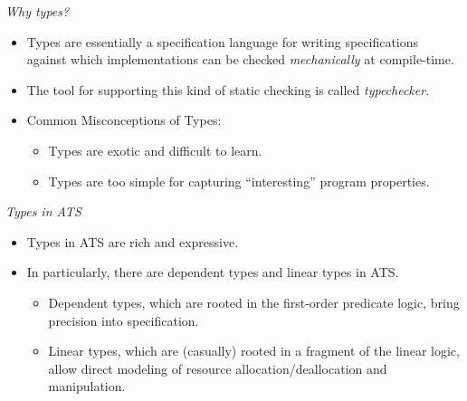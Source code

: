 \documentclass[pdf]{prosper}
\begin{document}
\begin{slide}{\em Why types?}
\begin{itemize}

\item
Types are essentially a specification language for writing specifications
against which implementations can be checked {\em mechanically} at
compile-time.

\item
The tool for supporting this kind of static checking is called
{\em typechecker}.

\item
Common Misconceptions of Types:
\begin{itemize}
\item Types are exotic and difficult to learn.
\item Types are too simple for capturing ``interesting'' program properties.
\end{itemize}

\end{itemize}
\end{slide}
\begin{slide}{\em Types in ATS}
\begin{itemize}
\item Types in ATS are rich and expressive.
\item In particularly, there are dependent types and linear types in ATS.
\begin{itemize}
\item Dependent types, which are rooted in the first-order
predicate logic, bring precision into specification.
\item Linear types, which are (casually) rooted in a fragment of the linear
logic, allow direct modeling of resource allocation/deallocation and manipulation.
\end{itemize}
\end{itemize}
\end{slide}
\end{document}

